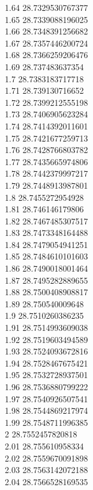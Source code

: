 {1.64	28.7329530767377\\
1.65	28.7339088196025\\
1.66	28.7348391256682\\
1.67	28.7357446200724\\
1.68	28.7366259206476\\
1.69	28.737483637354\\
1.7	28.7383183717718\\
1.71	28.739130716652\\
1.72	28.7399212555198\\
1.73	28.7406905623284\\
1.74	28.7414392011601\\
1.75	28.7421677259713\\
1.76	28.7428766803782\\
1.77	28.7435665974806\\
1.78	28.7442379997217\\
1.79	28.7448913987801\\
1.8	28.7455272954928\\
1.81	28.746146179806\\
1.82	28.7467485307517\\
1.83	28.7473348164488\\
1.84	28.7479054941251\\
1.85	28.7484610101603\\
1.86	28.7490018001464\\
1.87	28.7495282889655\\
1.88	28.7500408908817\\
1.89	28.750540009648\\
1.9	28.7510260386235\\
1.91	28.7514993609038\\
1.92	28.7519603494589\\
1.93	28.7524093672816\\
1.94	28.7528467675421\\
1.95	28.7532728937501\\
1.96	28.7536880799222\\
1.97	28.7540926507541\\
1.98	28.7544869217974\\
1.99	28.7548711996385\\
2	28.7552457820818\\
2.01	28.755610958334\\
2.02	28.7559670091898\\
2.03	28.7563142072188\\
2.04	28.7566528169535\\
}
